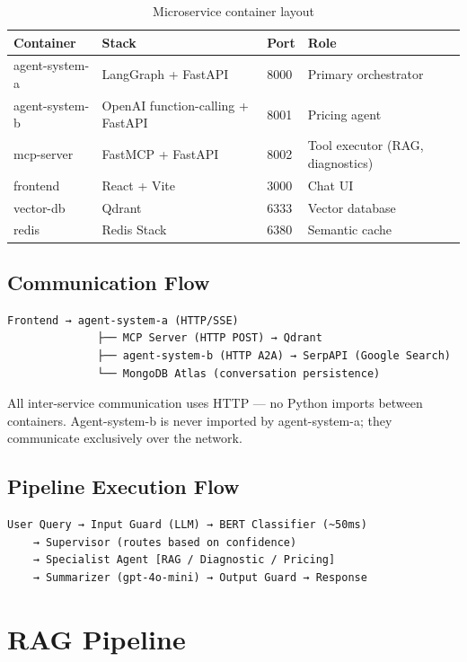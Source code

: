 \documentclass[12pt,a4paper]{article}
\begin{document}
\begin{table}[H]
\centering
\begin{tabular}{llll}
\toprule
\textbf{Container} & \textbf{Stack} & \textbf{Port} & \textbf{Role} \\
\midrule
agent-system-a & LangGraph + FastAPI & 8000 & Primary orchestrator \\
agent-system-b & OpenAI function-calling + FastAPI & 8001 & Pricing agent \\
mcp-server & FastMCP + FastAPI & 8002 & Tool executor (RAG, diagnostics) \\
frontend & React + Vite & 3000 & Chat UI \\
vector-db & Qdrant & 6333 & Vector database \\
redis & Redis Stack & 6380 & Semantic cache \\
\bottomrule
\end{tabular}
\caption{Microservice container layout}
\end{table}

\subsection{Communication Flow}

\begin{verbatim}
Frontend → agent-system-a (HTTP/SSE)
              ├── MCP Server (HTTP POST) → Qdrant
              ├── agent-system-b (HTTP A2A) → SerpAPI (Google Search)
              └── MongoDB Atlas (conversation persistence)
\end{verbatim}

All inter-service communication uses HTTP — no Python imports between containers. Agent-system-b is never imported by agent-system-a; they communicate exclusively over the network.

\subsection{Pipeline Execution Flow}

\begin{verbatim}
User Query → Input Guard (LLM) → BERT Classifier (~50ms)
    → Supervisor (routes based on confidence)
    → Specialist Agent [RAG / Diagnostic / Pricing]
    → Summarizer (gpt-4o-mini) → Output Guard → Response
\end{verbatim}

\section{RAG Pipeline}
\end{document}

